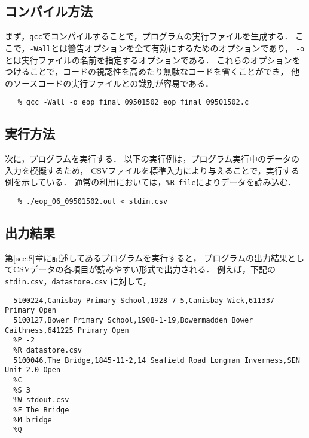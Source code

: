 \documentclass[autodetect-engine,dvi=dvipdfmx,ja=standard,
               a4j,11pt]{bxjsarticle}
\begin{document}
\subsection{コンパイル方法}

まず，\verb|gcc|でコンパイルすることで，プログラムの実行ファイルを生成する．
ここで，\verb|-Wall|とは警告オプションを全て有効にするためのオプションであり，
\verb|-o|とは実行ファイルの名前を指定するオプションである．
これらのオプションをつけることで，コードの視認性を高めたり無駄なコードを省くことができ，
他のソースコードの実行ファイルとの識別が容易である．

{\fontsize{10pt}{11pt} \selectfont
 \begin{verbatim}
   % gcc -Wall -o eop_final_09501502 eop_final_09501502.c
 \end{verbatim}
}

\subsection{実行方法}

次に，プログラムを実行する．
以下の実行例は，プログラム実行中のデータの入力を模擬するため，
CSVファイルを標準入力により与えることで，実行する例を示している．
通常の利用においては，\verb|%R file|によりデータを読み込む．

{\fontsize{10pt}{11pt} \selectfont
 \begin{verbatim}
   % ./eop_06_09501502.out < stdin.csv
 \end{verbatim}
}

\subsection{出力結果}

第\ref{sec:8}章に記述してあるプログラムを実行すると，
プログラムの出力結果としてCSVデータの各項目が読みやすい形式で出力される．
例えば，下記の \verb|stdin.csv|，\verb|datastore.csv| に対して，

{\fontsize{10pt}{11pt} \selectfont
 \begin{verbatim}
  5100224,Canisbay Primary School,1928-7-5,Canisbay Wick,611337 Primary Open
  5100127,Bower Primary School,1908-1-19,Bowermadden Bower Caithness,641225 Primary Open
  %P -2
  %R datastore.csv
  5100046,The Bridge,1845-11-2,14 Seafield Road Longman Inverness,SEN Unit 2.0 Open
  %C
  %S 3
  %W stdout.csv
  %F The Bridge
  %M bridge
  %Q
 \end{verbatim}
}
\end{document}
